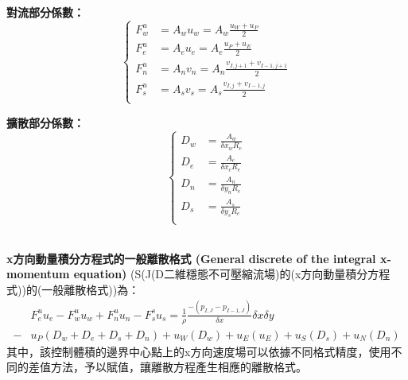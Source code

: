 \documentclass[12pt]{article}
\theoremstyle{upright}
\begin{document}
\begin{minipage}[t]{0.55\textwidth}
\textbf{對流部分係數：}
\begin{equation}\left\{\begin{aligned}
F_{w}^{u} &=  A_{w}u_{w} = A_{w}\frac{u_{W}+u_{P}}{2} \\[1.5ex]
F_{e}^{u} &=  A_{e}u_{e} = A_{e}\frac{u_{P}+u_{E}}{2} \\[1.5ex]
F_{n}^{u} &=  A_{n}v_{n} = A_{n}\frac{v_{I,j+1}+v_{I-1,j+1}}{2}\\[1.5ex]
F_{s}^{u} &=  A_{s}v_{s} = A_{s}\frac{v_{I,j}+v_{I-1,j}}{2}\\[1.5ex]
\end{aligned}\right.\end{equation}
\end{minipage}\hfill
\begin{minipage}[t]{0.39\textwidth}
\textbf{擴散部分係數：}
\begin{equation}\left\{\begin{aligned}
D_{w} &= \frac{A_{w}}{\delta x_{w}R_{e}}  \\[0.7ex]
D_{e} &= \frac{A_{e}}{\delta x_{e}R_{e}}  \\[0.7ex]
D_{n} &= \frac{A_{n}}{\delta y_{n}R_{e}}  \\[0.7ex]
D_{s} &= \frac{A_{s}}{\delta y_{s}R_{e}}  \\[0.7ex]
\end{aligned}\right.\end{equation}
\end{minipage}
\\[1.5ex]
\noindent \textbf{x方向動量積分方程式的一般離散格式 (General discrete of the integral x-momentum equation)}
\noindent (S(J(D二維穩態不可壓縮流場)的(x方向動量積分方程式))的(一般離散格式))為：
\begin{equation}\begin{split}
    &F_{e}^{u}u_{e} - F_{w}^{u}u_{w} + F_{n}^{u}u_{n} - F_{s}^{s}u_{s} = \frac{1}{\rho} \frac{-\left(p_{I,J} - p_{I-1,J}\right)}{\delta x} \delta x\delta y \\
    -& u_{P}\left(D_{w}+D_{e}+D_{s}+D_{n}\right) +  u_{W}\left(D_{w}\right) + u_{E}\left(u_{E}\right)+ u_{S}\left(D_{s}\right)+ u_{N}\left(D_{n}\right) 
\end{split}\end{equation}
\noindent 其中，該控制體積的邊界中心點上的x方向速度場可以依據不同格式精度，使用不同的差值方法，予以賦值，讓離散方程產生相應的離散格式。
\end{document}
